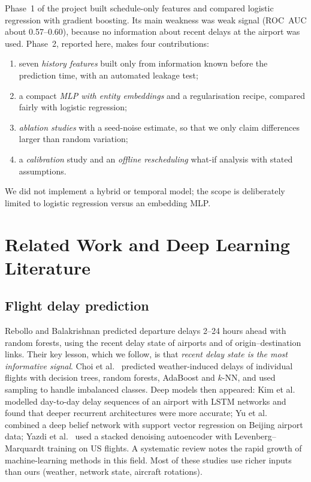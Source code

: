 \documentclass[conference]{IEEEtran}
\begin{document}
Phase~1 of the project built schedule-only features and compared logistic regression with gradient boosting. Its main weakness was weak signal (ROC~AUC about 0.57--0.60), because no information about recent delays at the airport was used. Phase~2, reported here, makes four contributions:
\begin{enumerate}
\item seven \emph{history features} built only from information known before the prediction time, with an automated leakage test;
\item a compact \emph{MLP with entity embeddings} and a regularisation recipe, compared fairly with logistic regression;
\item \emph{ablation studies} with a seed-noise estimate, so that we only claim differences larger than random variation;
\item a \emph{calibration} study and an \emph{offline rescheduling} what-if analysis with stated assumptions.
\end{enumerate}
We did not implement a hybrid or temporal model; the scope is deliberately limited to logistic regression versus an embedding MLP.

\section{Related Work and Deep Learning Literature}
\subsection{Flight delay prediction}
Rebollo and Balakrishnan \cite{rebollo} predicted departure delays 2--24 hours ahead with random forests, using the recent delay state of airports and of origin--destination links. Their key lesson, which we follow, is that \emph{recent delay state is the most informative signal}. Choi et al.\ \cite{choi} predicted weather-induced delays of individual flights with decision trees, random forests, AdaBoost and $k$-NN, and used sampling to handle imbalanced classes. Deep models then appeared: Kim et al.\ \cite{kim} modelled day-to-day delay sequences of an airport with LSTM networks and found that deeper recurrent architectures were more accurate; Yu et al.\ \cite{yu} combined a deep belief network with support vector regression on Beijing airport data; Yazdi et al.\ \cite{yazdi} used a stacked denoising autoencoder with Levenberg--Marquardt training on US flights. A systematic review \cite{carvalho} notes the rapid growth of machine-learning methods in this field. Most of these studies use richer inputs than ours (weather, network state, aircraft rotations).
\end{document}
